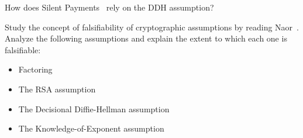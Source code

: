 \begin{exercise}[Optional]
  How does Silent Payments~\cite{add:bip-silentpayments} rely on the DDH assumption?
\end{exercise}

\begin{exercise}[Optional]
  Study the concept of falsifiability of cryptographic assumptions by reading Naor~\cite{C:Naor03}.
  Analyze the following assumptions and explain the extent to which each one is falsifiable:
  \begin{itemize}
    \item Factoring
    \item The RSA assumption
    \item The Decisional Diffie-Hellman assumption
    \item The Knowledge-of-Exponent assumption
  \end{itemize}
\end{exercise}
